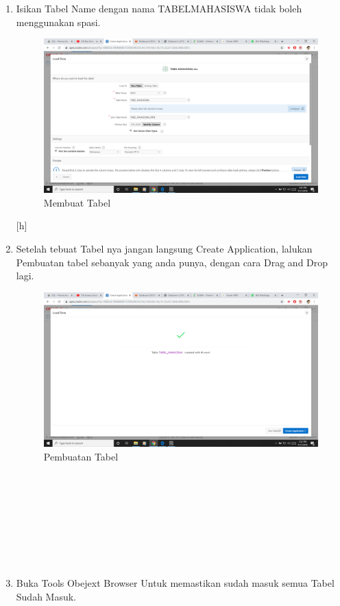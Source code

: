 \documentclass[12pt, times new roman]{article}
\begin{document}
\begin{enumerate}
\\
\\
\\
\\
\item Isikan Tabel Name dengan nama TABEL\textunderscore MAHASISWA tidak boleh menggunakan spasi.
\begin{figure}[h]
	\centering
		\includegraphics[scale=0.2]{Gambar/Capture4}
	\caption{Membuat Tabel}
\end{figure}[h]
\item Setelah tebuat Tabel nya jangan langsung Create Application, lalukan Pembuatan tabel sebanyak yang anda punya, dengan cara Drag and Drop lagi.
\begin{figure}[h]
	\centering
		\includegraphics[scale=0.2]{Gambar/Capture5}
	\caption{Pembuatan Tabel}
\end{figure}
\\
\\
\\
\\
\\
\\
\\
\item Buka Tools Obejext Browser Untuk memastikan sudah masuk semua Tabel Sudah Masuk.


\end{enumerate}
\end{document}
